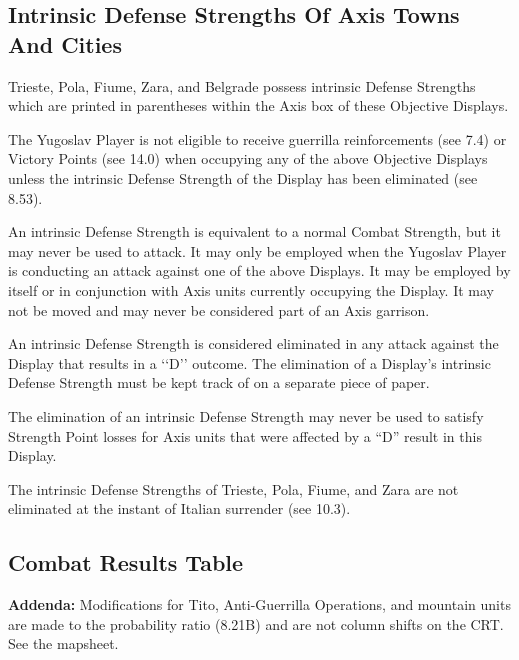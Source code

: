 \subsection{Intrinsic Defense Strengths Of Axis Towns And Cities}\label{sec:8.5}

Trieste, Pola, Fiume, Zara, and Belgrade possess intrinsic Defense Strengths which are printed in parentheses within the Axis box of these Objective Displays.

 The Yugoslav Player is not eligible to receive guerrilla reinforcements (see 7.4) or Victory Points (see 14.0) when occupying any of the above Objective Displays unless the intrinsic Defense Strength of the Display has been eliminated (see 8.53).

 An intrinsic Defense Strength is equivalent to a normal Combat Strength, but it may never be used to attack. It may only be employed when the Yugoslav Player is conducting an attack against one of the above Displays. It may be employed by itself or in conjunction with Axis units currently occupying the Display. It may not be moved and may never be considered part of an Axis garrison.

 An intrinsic Defense Strength is considered eliminated in any attack against the Display that results in a ‘‘D’’ outcome. The elimination of a Display’s intrinsic Defense Strength must be kept track of on a separate piece of paper.

 The elimination of an intrinsic Defense Strength may never be used to satisfy Strength Point losses for Axis units that were affected by a ``D'' result in this Display.

 The intrinsic Defense Strengths of Trieste, Pola, Fiume, and Zara are not eliminated at the instant of Italian surrender (see 10.3).

\subsection{Combat Results Table}\label{sec:8.6}

\textbf{Addenda:} Modifications for Tito, Anti-Guerrilla Operations, and
mountain units are made to the probability ratio (8.21B) and are not column
shifts on the CRT. See the mapsheet.
